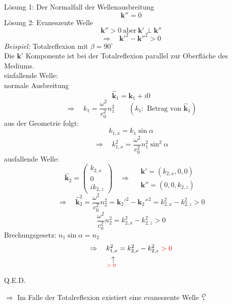 \documentclass[titlepage,11pt,a4paper,ngerman]{report}
\newcommand{\tx}[1]{\textrm{#1}}
\newcommand{\custo}[3]{\underset{\scriptstyle\overset{\mkern4mu\rotatebox{-90}{$\,#1$}}{#3}}{#2}}
\renewcommand{\vec}[1]{\boldsymbol{#1}}
\newcommand{\lcom}[1]{\color{MidnightBlue}#1\color{black}}
\newcommand{\mau}{$\buildrel \mathcal{O} \over{\textbf{.}}$}
\begin{document}
Lösung 1: Der Normalfall der Wellenausbreitung
\begin{equation*}
\vec{k}'' = 0
\end{equation*}
Lösung 2: Evaneszente Welle
\begin{equation*}
\vec{k}'' > 0 \ \tx{aber} \ \vec{k}' \perp \vec{k}''
\end{equation*}
\begin{equation*}
\Rightarrow \quad \vec{k}'^2 - \vec{k}''^2 > 0
\end{equation*}
\emph{Beispiel:} Totalreflexion mit $ \beta = 90 ^\circ $\\
\lcom{Die $ \vec{k}' $ Komponente ist bei der Totalreflexion parallel zur Oberfläche des Mediums.}\\[5pt]
einfallende Welle:\\
normale Ausbreitung
\begin{equation*}
\hat{\vec{k}}_1 = \vec{k}_1 + i 0
\end{equation*}
\begin{equation*}
\Rightarrow \quad k_1 = \frac{\omega^2}{c_0^2} n_1^2 \qquad (k_1: \tx{ Betrag von } \hat{\vec{k}}_1)
\end{equation*}
aus der Geometrie folgt:
\begin{equation*}
k_{1,x} = k_1 \sin\alpha
\end{equation*}
\begin{equation*}
\Rightarrow \quad k_{1,x}^2 = \frac{\omega^2}{c_0^2} n_1^2 \sin^2 \alpha
\end{equation*}
ausfallende Welle:
\begin{equation*}
\hat{\vec{k}}_2 = \begin{pmatrix}
k_{2,x} \\ 0 \\ i k_{2,z}
\end{pmatrix} \quad \Rightarrow \quad \begin{array}{c}
\vec{k}' = (k_{2,x} , 0 , 0) \\ \vec{k}'' = (0 , 0 , k_{2,z})
\end{array}
\end{equation*}
\begin{equation*}
\Rightarrow \quad \hat{\vec{k}}_2^2 = \frac{\omega^2}{c_0^2} n_2^2 = \vec{k}_2'^2 - \vec{k}_2''^2 = k_{2,x}^2 - k_{2,z}^2 > 0
\end{equation*}
\begin{equation*}
\frac{\omega^2}{c_0^2} n_2^2 = k_{2,x}^2 - k_{2,z}^2 > 0
\end{equation*}
Brechungsgesetz: $ n_1 \sin\alpha = n_2 $
\begin{equation*}
\Rightarrow \quad \custo{\leftarrow}{k_{1,x}^2}{\tx{\color{red} > 0 \color{black}}} = k_{2,x}^2 - k_{2,z}^2 \color{red} >0 \color{black}
\end{equation*}
\begin{flushright}
	\vspace{-20pt}
	\color{red} Q.E.D. \color{black}
\end{flushright}
$ \Rightarrow $ Im Falle der Totalreflexion existiert eine evaneszente Welle \mau
\end{document}
